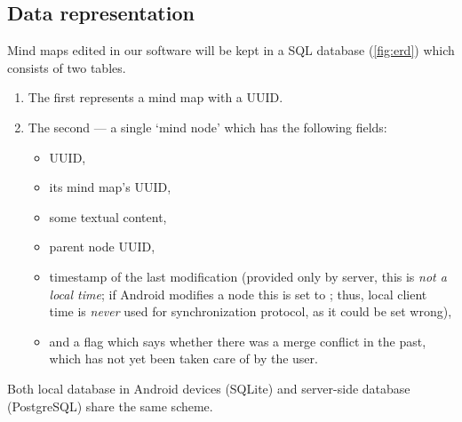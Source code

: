 %
%
%
%
%

\subsection{Data representation}
\label{subsec:data-repr}

Mind maps edited in our software will be kept in a SQL database (\cref{fig:erd}) which consists of two tables.

\begin{enumerate}
	\item The first represents a mind map with a UUID.
	\item The second --- a single `mind node' which has the following fields: \begin{itemize}
		\item UUID,
		\item its mind map's UUID,
		\item some textual content,
		\item parent node UUID,
		\item timestamp of the last modification (provided only by server, this is \emph{not a local time}; if Android modifies a node this is set to ; thus, local client time is \emph{never} used for synchronization protocol, as it could be set wrong),
		\item and a flag which says whether there was a merge conflict in the past, which has not yet been taken care of by the user.
	\end{itemize}
\end{enumerate}

Both local database in Android devices (SQLite) and server-side database (PostgreSQL) share the same scheme.

